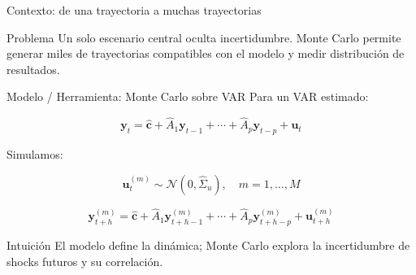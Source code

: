\documentclass[10pt,aspectratio=169]{beamer}
\begin{document}
\begin{frame}{Contexto: de una trayectoria a muchas trayectorias}
\begin{block}{Problema}
Un solo escenario central oculta incertidumbre. Monte Carlo permite generar miles de trayectorias compatibles con el modelo y medir distribución de resultados.
\end{block}

\begin{center}
\end{center}
\end{frame}

\begin{frame}{Modelo / Herramienta: Monte Carlo sobre VAR}
Para un VAR estimado:

\[
\bm y_t = \hat{\bm c} + \hat A_1 \bm y_{t-1} + \cdots + \hat A_p \bm y_{t-p} + \bm u_t
\]

Simulamos:

\[
\bm u_t^{(m)} \sim \mathcal{N}(0,\hat \Sigma_u),
\quad m = 1,\ldots,M
\]

\[
\bm y_{t+h}^{(m)} =
\hat{\bm c} + \hat A_1 \bm y_{t+h-1}^{(m)} + \cdots + \hat A_p \bm y_{t+h-p}^{(m)}
+ \bm u_{t+h}^{(m)}
\]

\begin{block}{Intuición}
El modelo define la dinámica; Monte Carlo explora la incertidumbre de shocks futuros y su correlación.
\end{block}
\end{frame}
\end{document}
